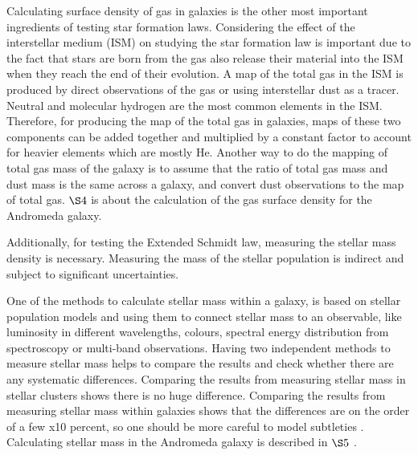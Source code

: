 \documentclass[useAMS,usenatbib]{mn2e}
\begin{document}
Calculating surface density of gas in galaxies is the other most important ingredients of testing star formation laws. Considering the effect of the interstellar medium (ISM) on studying the star formation law is important due to the fact that stars are born from the gas also release their material into the ISM when they reach the end of their evolution. A map of the total gas in the ISM is produced by direct observations of the gas or using interstellar dust as a tracer. Neutral and molecular hydrogen are the most common elements in the ISM. Therefore, for producing the map of the total gas in galaxies, maps of these two components can be added together and multiplied by a constant factor to account for heavier elements which are mostly He. Another way to do the mapping of total gas mass of the galaxy is to assume that the ratio of total gas mass and dust mass is the same across a galaxy, and convert dust observations to the map of total gas. $\S4$ is about the calculation of the gas surface density for the Andromeda galaxy.


Additionally, for testing the Extended Schmidt law, measuring the stellar mass density is necessary. Measuring the mass of the stellar population is indirect and subject to significant uncertainties.%

One of the methods to calculate stellar mass within a galaxy, is based on stellar population models \citep[e.g.][]{ Bruzual93, Kotulla09} and using them to connect stellar mass to an observable, like luminosity in different wavelengths, colours, spectral energy distribution from spectroscopy or multi-band observations. Having two independent methods to measure stellar mass helps to compare the results and check whether there are any systematic differences. Comparing the results from measuring stellar mass in stellar clusters shows there is no huge difference. Comparing the results from measuring stellar mass within galaxies shows that the differences are on the order of a few x10 percent, so one should be more careful to model subtleties \citep{McLaughlin05}. Calculating stellar mass in the Andromeda galaxy is described in  $\S5$ .
\end{document}
